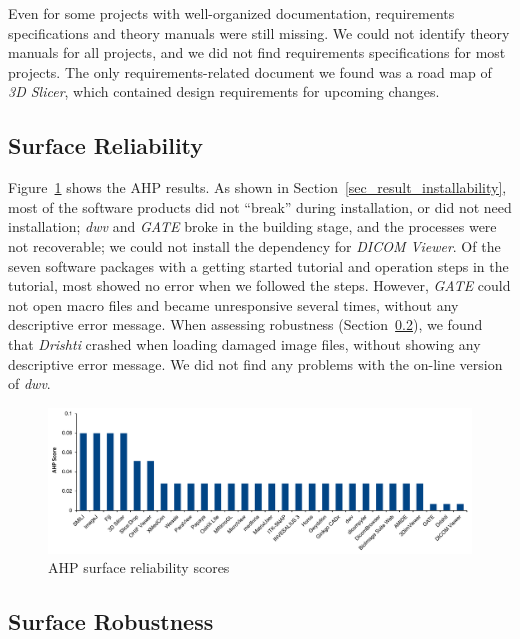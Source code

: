 \documentclass[11pt]{article}
\begin{document}
Even for some projects with well-organized documentation, requirements
specifications and theory manuals were still missing.  We could not identify
theory manuals for all projects, and we did not find requirements specifications
for most projects. The only requirements-related document we found was a road
map of \textit{3D Slicer}, which contained design requirements for upcoming
changes.

\subsection{Surface Reliability} \label{sec_result_reliability}

Figure~\ref{fg_reliability_scores} shows the AHP results.  As shown in
Section~\ref{sec_result_installability}, most of the software products did not
``break'' during installation, or did not need installation; \textit{dwv} and
\textit{GATE} broke in the building stage, and the processes were not
recoverable; we could not install the dependency for \textit{DICOM Viewer}. Of
the seven software packages with a getting started tutorial and operation steps
in the tutorial, most showed no error when we followed the steps. However,
\textit{GATE} could not open macro files and became unresponsive several times,
without any descriptive error message. When assessing robustness
(Section~\ref{sec_result_robustness}), we found that \textit{Drishti} crashed
when loading damaged image files, without showing any descriptive error message.
We did not find any problems with the on-line version of
\textit{dwv}.

\begin{figure}[!ht]
\includegraphics[scale=0.47]{reliability_scores.pdf}
\caption{AHP surface reliability scores}
\label{fg_reliability_scores}
\end{figure}

\subsection{Surface Robustness} \label{sec_result_robustness}
\end{document}
